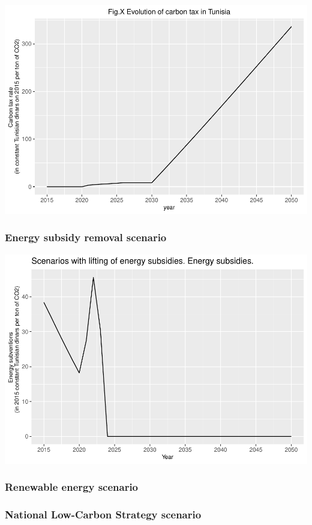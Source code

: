 \documentclass[
]{article}
\begin{document}
\begin{center}\includegraphics[width=0.7\linewidth,height=0.7\textheight]{Modele-ThreeMe-Tunisie_Sequeira_Valilou_Wang_files/figure-latex/unnamed-chunk-6-1} \end{center}

\hypertarget{energy-subsidy-removal-scenario}{%
\subsubsection{Energy subsidy removal
scenario}\label{energy-subsidy-removal-scenario}}

\begin{center}\includegraphics[width=0.7\linewidth,height=0.7\textheight]{Modele-ThreeMe-Tunisie_Sequeira_Valilou_Wang_files/figure-latex/unnamed-chunk-7-1} \end{center}

\hypertarget{renewable-energy-scenario}{%
\subsubsection{Renewable energy
scenario}\label{renewable-energy-scenario}}

\hypertarget{national-low-carbon-strategy-scenario}{%
\subsubsection{National Low-Carbon Strategy
scenario}\label{national-low-carbon-strategy-scenario}}
\end{document}
